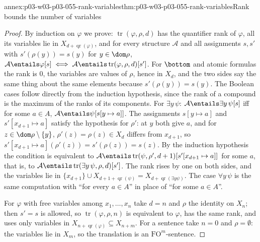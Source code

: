 \begin{annexitem}{annex:p03-w03-p03-055-rank-variables}{thm:p03-w03-p03-055-rank-variables}{Rank bounds the number of variables}
\begin{proof}
By induction on \(\varphi\) we prove: \(\operatorname{tr}(\varphi,\rho,d)\)
has the quantifier rank of \(\varphi\), all its variables lie in
\(X_{d+\operatorname{qr}(\varphi)}\), and for every structure
\(\mathcal A\) and all assignments \(s,s'\) with \(s'(\rho(y))=s(y)\) for
\(y\in\dom\rho\),
\(\mathcal A\entails\varphi[s]\iff
\mathcal A\entails\operatorname{tr}(\varphi,\rho,d)[s']\).
For \(\bottom\) and atomic formulas the rank is \(0\), the variables are
values of \(\rho\), hence in \(X_d\), and the two sides say the same thing
about the same elements because \(s'(\rho(y))=s(y)\). The Boolean cases
follow directly from the induction hypothesis, since the rank of a compound
is the maximum of the ranks of its components. For \(\exists y\,\psi\):
\(\mathcal A\entails\exists y\,\psi[s]\) iff for some \(a\in A\),
\(\mathcal A\entails\psi[s[y\mapsto a]]\). The assignments
\(s[y\mapsto a]\) and \(s'[x_{d+1}\mapsto a]\) satisfy the hypothesis
for \(\rho'\): at \(y\) both give \(a\), and for \(z\in\dom\rho\setminus\{y\}\),
\(\rho'(z)=\rho(z)\in X_d\) differs from \(x_{d+1}\), so
\(s'[x_{d+1}\mapsto a](\rho'(z))=s'(\rho(z))=s(z)\). By the induction
hypothesis the condition is equivalent to
\(\mathcal A\entails\operatorname{tr}(\psi,\rho',d+1)[s'[x_{d+1}\mapsto a]]\)
for some \(a\), that is, to
\(\mathcal A\entails\operatorname{tr}(\exists y\,\psi,\rho,d)[s']\). The
rank rises by one on both sides, and the variables lie in
\(\{x_{d+1}\}\cup X_{d+1+\operatorname{qr}(\psi)}=
X_{d+\operatorname{qr}(\exists y\psi)}\). The case \(\forall y\,\psi\) is
the same computation with ``for every \(a\in A\)'' in place of ``for some
\(a\in A\)''.

For \(\varphi\) with free variables among \(x_1,\ldots,x_n\) take \(d=n\)
and \(\rho\) the identity on \(X_n\); then \(s'=s\) is allowed, so
\(\operatorname{tr}(\varphi,\rho,n)\) is equivalent to \(\varphi\), has the
same rank, and uses only variables in
\(X_{n+\operatorname{qr}(\varphi)}\subseteq X_{n+m}\). For a sentence take
\(n=0\) and \(\rho=\emptyset\): the variables lie in \(X_m\), so the
translation is an \(\mathrm{FO}^m\)-sentence.
\end{proof}
\end{annexitem}

